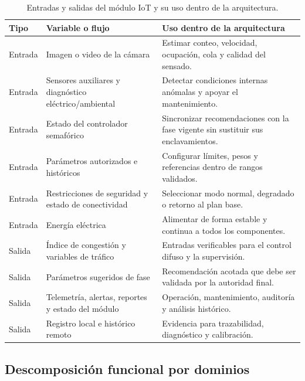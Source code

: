\begin{table}[H]
  \centering
  \caption{Entradas y salidas del módulo IoT y su uso dentro de la arquitectura.}
  \label{tab:entradas-salidas}
  \begin{tabularx}{\linewidth}{@{}>{\raggedright\arraybackslash}p{1.7cm}>{\raggedright\arraybackslash}p{5.0cm}>{\raggedright\arraybackslash}X@{}}
    \toprule
    \textbf{Tipo} & \textbf{Variable o flujo} & \textbf{Uso dentro de la arquitectura}\\
    \midrule
    Entrada & Imagen o video de la cámara & Estimar conteo, velocidad, ocupación, cola y calidad del sensado.\\
    Entrada & Sensores auxiliares y diagnóstico eléctrico/ambiental & Detectar condiciones internas anómalas y apoyar el mantenimiento.\\
    Entrada & Estado del controlador semafórico & Sincronizar recomendaciones con la fase vigente sin sustituir sus enclavamientos.\\
    Entrada & Parámetros autorizados e históricos & Configurar límites, pesos y referencias dentro de rangos validados.\\
    Entrada & Restricciones de seguridad y estado de conectividad & Seleccionar modo normal, degradado o retorno al plan base.\\
    Entrada & Energía eléctrica & Alimentar de forma estable y continua a todos los componentes.\\
    Salida & Índice de congestión y variables de tráfico & Entradas verificables para el control difuso y la supervisión.\\
    Salida & Parámetros sugeridos de fase & Recomendación acotada que debe ser validada por la autoridad final.\\
    Salida & Telemetría, alertas, reportes y estado del módulo & Operación, mantenimiento, auditoría y análisis histórico.\\
    Salida & Registro local e histórico remoto & Evidencia para trazabilidad, diagnóstico y calibración.\\
    \bottomrule
  \end{tabularx}
\end{table}

\subsection{Descomposición funcional por dominios}\label{sec:dominios-funcionales}

